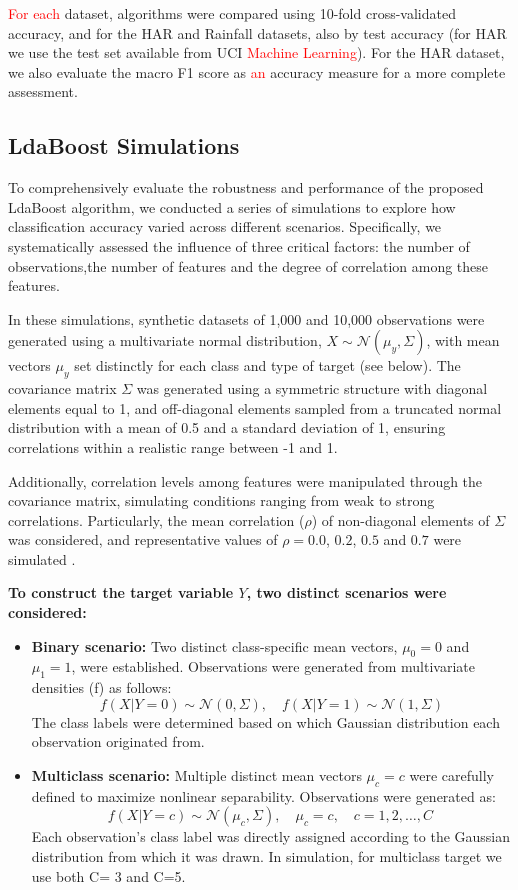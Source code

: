 \documentclass[11pt,a4paper]{article}
\providecommand{\DIFaddtex}[1]{\textcolor{red}{#1}} %
\providecommand{\DIFaddbegin}{} %
\providecommand{\DIFaddend}{} %
\providecommand{\DIFadd}[1]{\texorpdfstring{\DIFaddtex{#1}}{#1}} %
\begin{document}
\DIFadd{For each }\DIFaddend dataset, algorithms were compared using 10-fold cross-validated accuracy, and for the HAR and Rainfall datasets, also by test accuracy (for HAR we use the test set available from UCI  \DIFaddbegin \DIFadd{Machine Learning}\DIFaddend ). 
For the HAR dataset, we also evaluate the macro F1 score as  \DIFaddbegin \DIFadd{an }\DIFaddend accuracy measure for a more complete assessment.


\subsection*{LdaBoost Simulations}
To comprehensively evaluate the robustness and performance of the proposed LdaBoost algorithm, we conducted a series of simulations to explore how classification accuracy varied across different scenarios. Specifically, we systematically assessed the influence of three critical factors: the number of observations,the number of features and the degree of correlation among these features.

In these simulations, synthetic datasets of 1,000 and 10,000 observations were generated using a multivariate normal distribution, $X \sim \mathcal{N}(\mu_y, \Sigma)$, with mean vectors $\mu_y$ set distinctly for each class and type of target (see below). The covariance matrix $\Sigma$ was generated using a symmetric structure with diagonal elements equal to 1, and off-diagonal elements sampled from a truncated normal distribution with a mean of 0.5 and a standard deviation of 1, ensuring correlations within a realistic range between -1 and 1.

Additionally, correlation levels among features were manipulated through the covariance matrix, simulating conditions ranging from weak to strong correlations. Particularly, the mean correlation ($\rho$) of non-diagonal elements of $\Sigma$ was considered, and representative values of $\rho = 0.0$, $0.2$, $0.5$ and $0.7$ were simulated . 

\textbf{To construct the target variable $Y$, two distinct scenarios were considered:}

\begin{itemize}
    \item \textbf{Binary scenario:} Two distinct class-specific mean vectors, $\mu_0=0$ and $\mu_1=1$, were established. Observations were generated from multivariate densities (f) as follows:
    \[
    f(X|Y=0) \sim \mathcal{N}(0,\Sigma), \quad f(X|Y=1) \sim \mathcal{N}(1,\Sigma)
    \]
    The class labels were determined based on which Gaussian distribution each observation originated from.

    \item \textbf{Multiclass scenario:} Multiple distinct mean vectors $\mu_c = c$ were carefully defined to maximize nonlinear separability. Observations were generated as:
    \[
    f(X|Y=c) \sim \mathcal{N}(\mu_c,\Sigma),\quad \mu_c=c, \quad c = 1,2,\dots,C\
    \]
    Each observation's class label was directly assigned according to the Gaussian distribution from which it was drawn. In simulation, for multiclass target we use both C= 3 and C=5.
\end{itemize}
\end{document}
